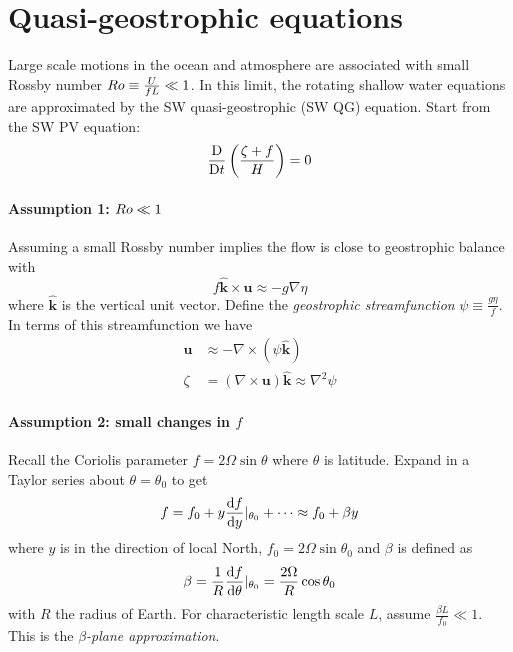 \documentclass{jknotes}
\begin{document}
\section{Quasi-geostrophic equations}
Large scale motions in the ocean and atmosphere are associated with small
Rossby number $Ro \equiv \frac{U}{fL} \ll 1$. In this limit, the rotating
shallow water equations are approximated by the SW quasi-geostrophic (SW QG)
equation. Start from the SW PV equation:
\begin{equation}
	\frac{\mathrm{D}}{\mathrm{D} t}\left(\frac{\zeta + f}{H}\right) =
	0\label{eq:PVcons2}
\end{equation}

\paragraph{Assumption 1: $Ro \ll 1$}
Assuming a small Rossby number implies the flow is close to geostrophic
balance with
\begin{equation}
	f \symbf{\hat{k}} \times \symbf{u} \approx -g \nabla \eta
\end{equation}
where $\hat{\symbf{k}}$ is the vertical unit vector. Define the \emph{geostrophic
streamfunction} $\psi \equiv \frac{g \eta}{f}$. In terms of this
streamfunction we have
\begin{align}
	\symbf{u} &\approx - \nabla \times (\psi \hat{\symbf{k}}) \\
	\zeta &= (\nabla \times \symbf{u})\hat{\symbf{k}} \approx \nabla^2 \psi
\end{align}

\paragraph{Assumption 2: small changes in $f$}
Recall the Coriolis parameter $f = 2 \Omega \sin \theta$ where $\theta$ is
latitude. Expand in a Taylor series about $\theta = \theta_0$ to get
\begin{equation}
	f = f_0 + y \frac{\diffd f}{\diffd y}\vert_{\theta_0} + \dots \approx f_0
	+ \beta y
\end{equation}
where $y$ is in the direction of local North, $f_0 = 2\Omega \sin \theta_0$
and $\beta$ is defined as
\begin{equation}
	\beta = \frac{1}{R} \frac{\diffd f}{\diffd \theta}\vert_{\theta_0} =
\frac{2\Omega}{R} \cos \theta_0\end{equation}
with $R$ the radius of Earth. For characteristic length scale $L$, assume
$\frac{\beta L}{f_0} \ll 1$. This is the \emph{$\beta$-plane approximation}.
\end{document}
